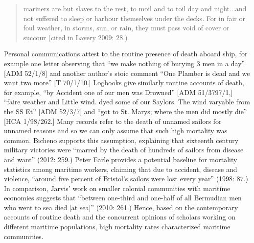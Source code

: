 \documentclass[12pt]{article}
\newenvironment{styleStandard}{\renewcommand\baselinestretch{1.0}\setlength\leftskip{0cm}\setlength\rightskip{0cm plus 1fil}\setlength\parindent{0cm}\setlength\parfillskip{0pt plus 1fil}\setlength\parskip{0in plus 1pt}\writerlistparindent\writerlistleftskip\leavevmode\normalfont\normalsize\writerlistlabel\ignorespaces}{\unskip\vspace{0in plus 1pt}\par}
\newcommand\writerlistleftskip{}
\newcommand\writerlistparindent{}
\newcommand\writerlistlabel{}
\begin{document}
\begin{quotation}
mariners are but slaves to the rest, to moil and to toil day and night...and not suffered to sleep or harbour themselves under the decks. For in fair or foul weather, in storms, sun, or rain, they must pass void of cover or succour (cited in Lavery 2009: 28.) 

\end{quotation}
\begin{styleStandard}
Personal communications attest to the routine presence of death aboard ship, for example one letter observing that “we make nothing of burying 3 men in a day” [ADM 52/1/8] and another author’s stoic comment “One Plamber is dead and we want two more” [T 70/1/10.] Logbooks give similarly routine accounts of death, for example, “by Accident one of our men was Drowned” [ADM 51/3797/1,] “faire weather and Little wind. dyed some of our Saylors. The wind varyable from the SS Et” [ADM 52/3/7] and “got to St. Marys; where the men did mostly die” [HCA 1/98/262.] Many records refer to the death of unnamed sailors for unnamed reasons and so we can only assume that such high mortality was common. Bicheno supports this assumption, explaining that sixteenth century military victories were “marred by the death of hundreds of sailors from disease and want” (2012: 259.) Peter Earle provides a potential baseline for mortality statistics among maritime workers, claiming that due to accident, disease and violence, “around five percent of Bristol’s sailors were lost every year” (1998: 87.) In comparison, Jarvis’ work on smaller colonial communities with maritime economies suggests that “between one-third and one-half of all Bermudian men who went to sea died [at sea]” (2010: 261.) Hence, based on the contemporary accounts of routine death and the concurrent opinions of scholars working on different maritime populations, high mortality rates characterized maritime communities. 
\end{styleStandard}
\end{document}
